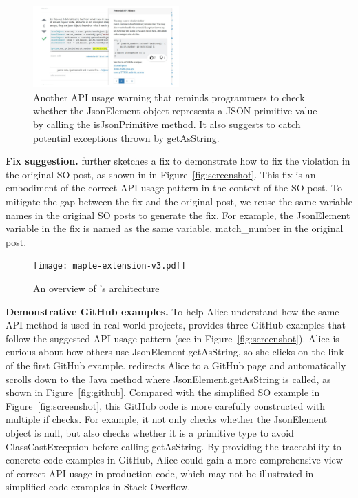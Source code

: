 \begin{figure}
\centering
\includegraphics[width=0.5\textwidth]{soap-v4-2.pdf}
  \caption{Another API usage warning that reminds programmers to check whether the {\ttt JsonElement} object represents a {\ttt JSON} primitive value by calling the {\ttt isJsonPrimitive} method. It also suggests to catch potential exceptions thrown by {\ttt getAsString}.}
  \label{fig:screenshot2}
\end{figure}

{\bf Fix suggestion.} {\tool} further sketches a fix to demonstrate how to fix the violation in the original SO post, as shown in  in Figure~\ref{fig:screenshot}. This fix is an embodiment of the correct API usage pattern in the context of the SO post. To mitigate the gap between the fix and the original post, we reuse the same variable names in the original SO posts to generate the fix. For example, the {\ttt JsonElement} variable in the fix is named as the same variable, {\ttt match\_number} in the original post.

\begin{figure}[!th]
\centering
\texttt{[image: maple-extension-v3.pdf]}
\caption{An overview of {\tool}'s architecture}
\label{fig:arch}
\end{figure}

{\bf Demonstrative GitHub examples.} To help Alice understand how the same API method is used in real-world projects, {\tool} provides three GitHub examples that follow the suggested API usage pattern (see  in Figure~\ref{fig:screenshot}). Alice is curious about how others use {\ttt JsonElement.getAsString}, so she clicks on the link of the first GitHub example. {\tool} redirects Alice to a GitHub page and automatically scrolls down to the Java method where {\ttt JsonElement.getAsString} is called, as shown in Figure~\ref{fig:github}. Compared with the simplified SO example in Figure~\ref{fig:screenshot}, this GitHub code is more carefully constructed with multiple {\ttt if} checks. For example, it not only checks whether the {\ttt JsonElement} object is {\ttt null}, but also checks whether it is a primitive type to avoid {\ttt ClassCastException} before calling {\ttt getAsString}. By providing the traceability to concrete code examples in GitHub, Alice could gain a more comprehensive view of correct API usage in production code, which may not be illustrated in simplified code examples in Stack Overflow. 

